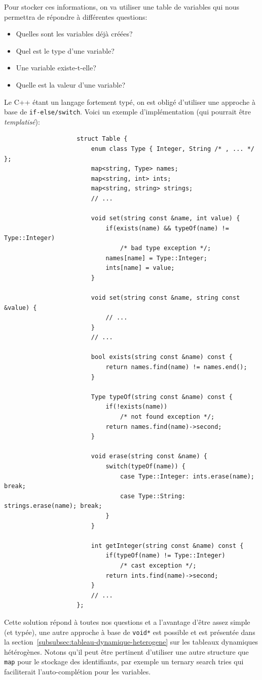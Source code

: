 \documentclass[french]{article}
\begin{document}
				Pour stocker ces informations, on va utiliser une table de variables qui nous permettra de répondre à différentes questions:
				
				\begin{itemize}
					\item Quelles sont les variables déjà créées?
					\item Quel est le type d'une variable?
					\item Une variable existe-t-elle?
					\item Quelle est la valeur d'une variable?
				\end{itemize}
				
				Le C++ étant un langage fortement typé, on est obligé d'utiliser une approche à base de \texttt{if-else/switch}. Voici un exemple d'implémentation (qui pourrait être \textit{templatisé}):
				
				\begin{lstlisting}
					struct Table {
						enum class Type { Integer, String /* , ... */ };
						map<string, Type> names;
						map<string, int> ints;
						map<string, string> strings;
						// ...
						
						void set(string const &name, int value) {
							if(exists(name) && typeOf(name) != Type::Integer)
								/* bad type exception */;
							names[name] = Type::Integer;
							ints[name] = value;
						}
						
						void set(string const &name, string const &value) {
							// ...
						}
						// ...
						
						bool exists(string const &name) const {
							return names.find(name) != names.end();
						}
						
						Type typeOf(string const &name) const {
							if(!exists(name))
								/* not found exception */;
							return names.find(name)->second;
						}
						
						void erase(string const &name) {
							switch(typeOf(name)) {
								case Type::Integer: ints.erase(name); break;
								case Type::String: strings.erase(name); break;
							}
						}
						
						int getInteger(string const &name) const {
							if(typeOf(name) != Type::Integer)
								/* cast exception */;
							return ints.find(name)->second;
						}
						// ...
					};
				\end{lstlisting}
				
				Cette solution répond à toutes nos questions et a l'avantage d'être assez simple (et typée), une autre approche à base de \texttt{void*} est possible et est présentée dans la section~\ref{subsubsec:tableau-dynamique-heterogene} sur les tableaux dynamiques hétérogènes. Notons qu'il peut être pertinent d'utiliser une autre structure que \texttt{map} pour le stockage des identifiants, par exemple un ternary search tries qui faciliterait l'auto-complétion pour les variables.
			
\end{document}
